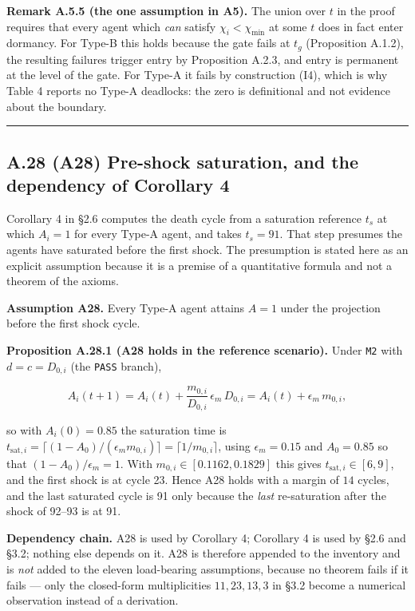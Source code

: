 \documentclass[11pt,a4paper]{article}
\begin{document}
\textbf{Remark A.5.5 (the one assumption in A5).} The union over \(t\) in the proof
requires that every agent which \emph{can} satisfy \(\chi_i<\chi_{\min}\) at some \(t\)
does in fact enter dormancy. For Type-B this holds because the gate fails at \(t_g\)
(Proposition A.1.2), the resulting failures trigger entry by Proposition A.2.3, and
entry is permanent at the level of the gate. For Type-A it fails by construction
(I4), which is why Table 4 reports no Type-A deadlocks: the zero is definitional
and not evidence about the boundary.

\begin{center}\rule{0.5\linewidth}{0.5pt}\end{center}

\subsection{A.28 (A28) Pre-shock saturation, and the dependency of Corollary 4}\label{a.28-a28-pre-shock-saturation-and-the-dependency-of-corollary-4}

Corollary 4 in §2.6 computes the death cycle from a saturation reference
\(t_s\) at which \(A_i=1\) for every Type-A agent, and takes \(t_s=91\). That step
presumes the agents have saturated before the first shock. The presumption is
stated here as an explicit assumption because it is a premise of a quantitative
formula and not a theorem of the axioms.

\textbf{Assumption A28.} Every Type-A agent attains \(A=1\) under the projection before
the first shock cycle.

\textbf{Proposition A.28.1 (A28 holds in the reference scenario).} Under \texttt{M2} with
\(d=c=D_{0,i}\) (the \texttt{PASS} branch),

\[
A_i(t+1)=A_i(t)+\frac{m_{0,i}}{D_{0,i}}\,\epsilon_m\,D_{0,i}
=A_i(t)+\epsilon_m\,m_{0,i},
\]

so with \(A_i(0)=0.85\) the saturation time is
\(t_{\mathrm{sat},i}=\lceil (1-A_0)/(\epsilon_m m_{0,i})\rceil=\lceil 1/m_{0,i}\rceil\),
using \(\epsilon_m=0.15\) and \(A_0=0.85\) so that \((1-A_0)/\epsilon_m=1\). With
\(m_{0,i}\in[0.1162,0.1829]\) this gives \(t_{\mathrm{sat},i}\in[6,9]\), and the first
shock is at cycle 23. Hence A28 holds with a margin of \(14\) cycles, and the last
saturated cycle is 91 only because the \emph{last} re-saturation after the shock of
92--93 is at 91.

\textbf{Dependency chain.} A28 is used by Corollary 4; Corollary 4 is used by §2.6 and
§3.2; nothing else depends on it. A28 is therefore appended to the inventory and
is \emph{not} added to the eleven load-bearing assumptions, because no theorem fails
if it fails --- only the closed-form multiplicities \(11,23,13,3\) in §3.2 become a
numerical observation instead of a derivation.
\end{document}
